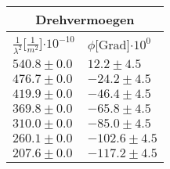 \documentclass{article}
\begin{document}
\begin{tabular}{|p{3cm}|p{3cm}|}
\hline
\multicolumn{2}{|c|}{Drehvermoegen}\\
\hline
$\frac{1}{\lambda^2}$[$\frac{1}{m^2}$]$\cdot 10^{-10}$&$\phi$[Grad]$\cdot 10^{0}$\\
\hline
$540.8\pm0.0$&$12.2\pm 4.5$\\
$476.7\pm0.0$&$-24.2\pm 4.5$\\
$419.9\pm0.0$&$-46.4\pm 4.5$\\
$369.8\pm0.0$&$-65.8\pm 4.5$\\
$310.0\pm0.0$&$-85.0\pm 4.5$\\
$260.1\pm0.0$&$-102.6\pm 4.5$\\
$207.6\pm0.0$&$-117.2\pm 4.5$\\
\hline
\end{tabular}
\end{document}
